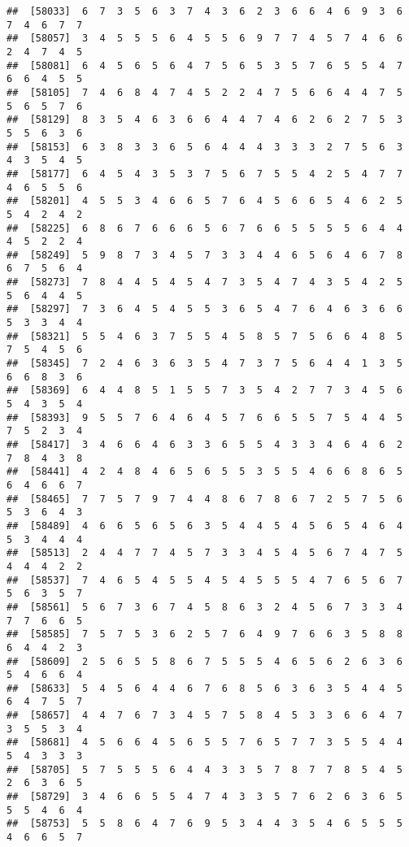 \documentclass[
]{book}
\begin{document}
\begin{verbatim}
##  [58033]  6  7  3  5  6  3  7  4  3  6  2  3  6  6  4  6  9  3  6  7  4  6  7  7
##  [58057]  3  4  5  5  5  6  4  5  5  6  9  7  7  4  5  7  4  6  6  2  4  7  4  5
##  [58081]  6  4  5  6  5  6  4  7  5  6  5  3  5  7  6  5  5  4  7  6  6  4  5  5
##  [58105]  7  4  6  8  4  7  4  5  2  2  4  7  5  6  6  4  4  7  5  5  6  5  7  6
##  [58129]  8  3  5  4  6  3  6  6  4  4  7  4  6  2  6  2  7  5  3  5  5  6  3  6
##  [58153]  6  3  8  3  3  6  5  6  4  4  4  3  3  3  2  7  5  6  3  4  3  5  4  5
##  [58177]  6  4  5  4  3  5  3  7  5  6  7  5  5  4  2  5  4  7  7  4  6  5  5  6
##  [58201]  4  5  5  3  4  6  6  5  7  6  4  5  6  6  5  4  6  2  5  5  4  2  4  2
##  [58225]  6  8  6  7  6  6  6  5  6  7  6  6  5  5  5  5  6  4  4  4  5  2  2  4
##  [58249]  5  9  8  7  3  4  5  7  3  3  4  4  6  5  6  4  6  7  8  6  7  5  6  4
##  [58273]  7  8  4  4  5  4  5  4  7  3  5  4  7  4  3  5  4  2  5  5  6  4  4  5
##  [58297]  7  3  6  4  5  4  5  5  3  6  5  4  7  6  4  6  3  6  6  5  3  3  4  4
##  [58321]  5  5  4  6  3  7  5  5  4  5  8  5  7  5  6  6  4  8  5  7  5  4  5  6
##  [58345]  7  2  4  6  3  6  3  5  4  7  3  7  5  6  4  4  1  3  5  6  6  8  3  6
##  [58369]  6  4  4  8  5  1  5  5  7  3  5  4  2  7  7  3  4  5  6  5  4  3  5  4
##  [58393]  9  5  5  7  6  4  6  4  5  7  6  6  5  5  7  5  4  4  5  7  5  2  3  4
##  [58417]  3  4  6  6  4  6  3  3  6  5  5  4  3  3  4  6  4  6  2  7  8  4  3  8
##  [58441]  4  2  4  8  4  6  5  6  5  5  3  5  5  4  6  6  8  6  5  6  4  6  6  7
##  [58465]  7  7  5  7  9  7  4  4  8  6  7  8  6  7  2  5  7  5  6  5  3  6  4  3
##  [58489]  4  6  6  5  6  5  6  3  5  4  4  5  4  5  6  5  4  6  4  5  3  4  4  4
##  [58513]  2  4  4  7  7  4  5  7  3  3  4  5  4  5  6  7  4  7  5  4  4  4  2  2
##  [58537]  7  4  6  5  4  5  5  4  5  4  5  5  5  4  7  6  5  6  7  5  6  3  5  7
##  [58561]  5  6  7  3  6  7  4  5  8  6  3  2  4  5  6  7  3  3  4  7  7  6  6  5
##  [58585]  7  5  7  5  3  6  2  5  7  6  4  9  7  6  6  3  5  8  8  6  4  4  2  3
##  [58609]  2  5  6  5  5  8  6  7  5  5  5  4  6  5  6  2  6  3  6  5  4  6  6  4
##  [58633]  5  4  5  6  4  4  6  7  6  8  5  6  3  6  3  5  4  4  5  6  4  7  5  7
##  [58657]  4  4  7  6  7  3  4  5  7  5  8  4  5  3  3  6  6  4  7  3  5  5  3  4
##  [58681]  4  5  6  6  4  5  6  5  5  7  6  5  7  7  3  5  5  4  4  5  4  3  3  3
##  [58705]  5  7  5  5  5  6  4  4  3  3  5  7  8  7  7  8  5  4  5  2  6  3  6  5
##  [58729]  3  4  6  6  5  5  4  7  4  3  3  5  7  6  2  6  3  6  5  5  5  4  6  4
##  [58753]  5  5  8  6  4  7  6  9  5  3  4  4  3  5  4  6  5  5  5  4  6  6  5  7

\end{verbatim}
\end{document}
